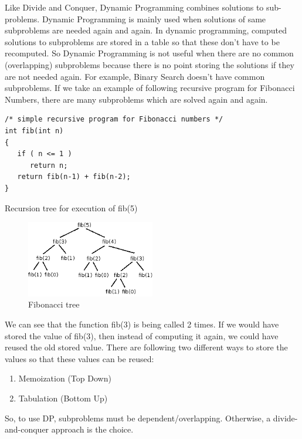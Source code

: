 \documentclass[12pt]{article}
\begin{document}
\par{\indent Like Divide and Conquer, Dynamic Programming combines solutions to sub-problems. Dynamic Programming is mainly used when solutions of same subproblems are needed again and again. In dynamic programming, computed solutions to subproblems are stored in a table so that these don’t have to be recomputed. So Dynamic Programming is not useful when there are no common (overlapping) subproblems because there is no point storing the solutions if they are not needed again. For example, Binary Search doesn’t have common subproblems. If we take an example of following recursive program for Fibonacci Numbers, there are many subproblems which are solved again and again.
\newline
\begin{lstlisting}
/* simple recursive program for Fibonacci numbers */
int fib(int n) 
{ 
   if ( n <= 1 ) 
      return n; 
   return fib(n-1) + fib(n-2); 
}
\end{lstlisting}
Recursion tree for execution of fib(5)
\begin{figure}[h!]
\centering
\includegraphics[width=0.5\textwidth]{fib5.png}
\caption{Fibonacci tree}
\end{figure}
We can see that the function fib(3) is being called 2 times. If we would have stored the value of fib(3), then instead of computing it again, we could have reused the old stored value. There are following two different ways to store the values so that these values can be reused:
\begin{enumerate}[label=(\alph*)]
\item Memoization (Top Down)
\item Tabulation (Bottom Up)
\end{enumerate}
So, to use DP, subproblems must be dependent/overlapping. Otherwise, a divide-and-conquer approach is the choice.

}
\end{document}

